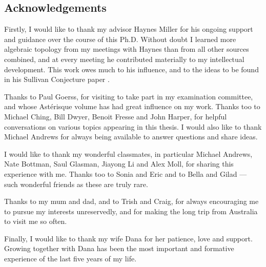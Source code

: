 \documentclass[11pt]{amsart} \renewcommand{\baselinestretch}{1.2}
\theoremstyle{plain}
\numberwithin{equation}{section} %
\theoremstyle{plain}
\numberwithin{equation}{chapter} %
\newcommand{\scrC}{\mathscr{C}}
\newcommand{\algs}{{\scrC\!\textit{\normalfont\textit{om}}}}
\newcommand{\BKSS}{BKSS}
\newcommand{\SubsectionOrSection}[1]{\subsection{#1}}
\begin{document}
\begin{Introduction}
%

\SubsectionOrSection{Acknowledgements}

Firstly, I would like to thank my advisor Haynes Miller for his ongoing support and guidance over the course of this Ph.D. Without doubt I learned more algebraic topology from my meetings with Haynes than from all other sources combined, and at every meeting he contributed materially to my intellectual development. This work owes much to his influence, and to the ideas to be found in his Sullivan Conjecture paper \cite{MillerSullivanConjecture.pdf}.

Thanks to Paul Goerss, for visiting to take part in my examination committee, and whose Ast\'erisque volume \cite{MR1089001} has had great influence on my work.
Thanks too to Michael Ching, Bill Dwyer, Benoit Fresse and John Harper, for helpful conversations on various topics appearing in this thesis. I would also like to thank Michael Andrews for always being available to answer questions and share ideas.

I would like to thank my wonderful classmates, in particular Michael Andrews, Nate Bottman, Saul Glasman, Jiayong Li  and Alex Moll, for sharing this experience with me.
Thanks too to Sonia and Eric and to Bella and Gilad --- such wonderful friends as these are truly rare.

Thanks to my mum and dad, and to Trish and Craig, for always encouraging me to pursue my interests unreservedly, and for making the long trip from Australia to visit me so often.

Finally, I would like to thank my wife Dana for her patience, love and support. 
Growing together with Dana has been the most important and formative experience of the last five years of my life.

\end{Introduction}
\end{document}
